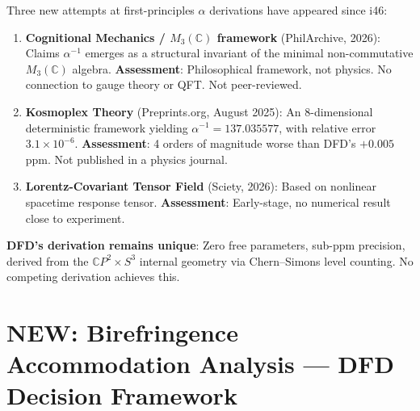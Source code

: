 \documentclass[11pt,a4paper]{article}
\newcommand{\NEW}{\textcolor{dfdblue}{\textbf{NEW}}}
\newcommand{\CP}{\mathbb{C}P}
\begin{document}
\begin{tcolorbox}[colback=green!5!white, colframe=green!60!black,
  title={Competing $\alpha$ Derivations: 2025--2026 Landscape}]

Three new attempts at first-principles $\alpha$ derivations have appeared since i46:

\begin{enumerate}
\item \textbf{Cognitional Mechanics / $M_3(\mathbb{C})$ framework} (PhilArchive, 2026): Claims $\alpha^{-1}$ emerges as a structural invariant of the minimal non-commutative $M_3(\mathbb{C})$ algebra. \textbf{Assessment}: Philosophical framework, not physics. No connection to gauge theory or QFT. Not peer-reviewed.

\item \textbf{Kosmoplex Theory} (Preprints.org, August 2025): An 8-dimensional deterministic framework yielding $\alpha^{-1} = 137.035577$, with relative error $3.1 \times 10^{-6}$. \textbf{Assessment}: 4 orders of magnitude worse than DFD's $+0.005$ ppm. Not published in a physics journal.

\item \textbf{Lorentz-Covariant Tensor Field} (Sciety, 2026): Based on nonlinear spacetime response tensor. \textbf{Assessment}: Early-stage, no numerical result close to experiment.
\end{enumerate}

\textbf{DFD's derivation remains unique}: Zero free parameters, sub-ppm precision, derived from the $\CP^2 \times S^3$ internal geometry via Chern--Simons level counting. No competing derivation achieves this.
\end{tcolorbox}

\section{\NEW: Birefringence Accommodation Analysis --- DFD Decision Framework}
\end{document}
